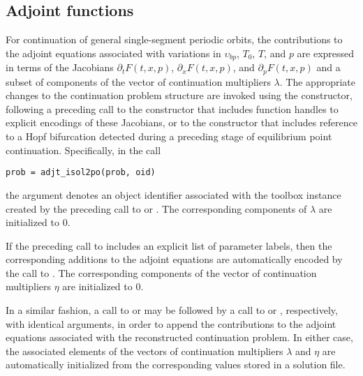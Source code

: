 \subsection{Adjoint functions}
For continuation of general single-segment periodic orbits, the contributions to the adjoint equations associated with variations in $\upsilon_{bp}$, $T_0$, $T$, and $p$ are expressed in terms of the Jacobians $\partial_t F(t,x,p)$, $\partial_x F(t,x,p)$, and $\partial_p F(t,x,p)$ and a subset of components of the vector of continuation multipliers $\lambda$. The appropriate changes to the continuation problem structure are invoked using the  constructor, following a preceding call to the  constructor that includes function handles to explicit encodings of these Jacobians, or to the  constructor that includes reference to a Hopf bifurcation detected during a preceding stage of equilibrium point continuation. Specifically, in the call
\begin{lstlisting}[language=coco-highlight]
prob = adjt_isol2po(prob, oid)
\end{lstlisting}
the  argument denotes an object identifier associated with the toolbox instance created by the preceding call to  or . The corresponding components of $\lambda$ are initialized to $0$.

If the preceding call to  includes an explicit list of parameter labels, then the corresponding additions to the adjoint equations are automatically encoded by the call to . The corresponding components of the vector of continuation multipliers $\eta$ are initialized to $0$.

In a similar fashion, a call to  or  may be followed by a call to  or , respectively, with identical arguments, in order to append the contributions to the adjoint equations associated with the reconstructed continuation problem. In either case, the associated elements of the vectors of continuation multipliers $\lambda$ and $\eta$ are automatically initialized from the corresponding values stored in a solution file.

